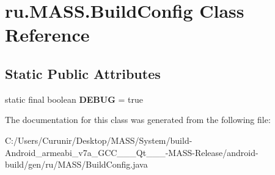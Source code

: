 \hypertarget{classru_1_1_m_a_s_s_1_1_build_config}{}\section{ru.\+M\+A\+S\+S.\+Build\+Config Class Reference}
\label{classru_1_1_m_a_s_s_1_1_build_config}
\subsection*{Static Public Attributes}
\begin{DoxyCompactItemize}
\item 
\mbox{\label{classru_1_1_m_a_s_s_1_1_build_config_af47993c7eb14c536fa669cba649ae633}} 
static final boolean {\bfseries D\+E\+B\+UG} = true
\end{DoxyCompactItemize}


The documentation for this class was generated from the following file\+:\begin{DoxyCompactItemize}
\item 
C\+:/\+Users/\+Curunir/\+Desktop/\+M\+A\+S\+S/\+System/build-\/\+Android\+\_\+armeabi\+\_\+v7a\+\_\+\+G\+C\+C\+\_\+\_\+\_\+\+Qt\+\_\+\_\+\_-\/\+M\+A\+S\+S-\/\+Release/android-\/build/gen/ru/\+M\+A\+S\+S/Build\+Config.\+java\end{DoxyCompactItemize}
